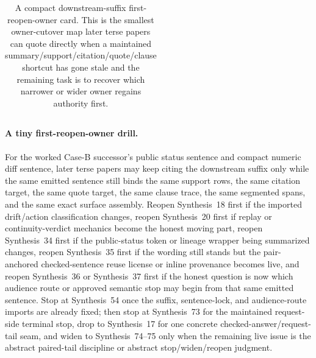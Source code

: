 \documentclass[11pt]{article}
\begin{document}
\begin{table}[t]
\begin{tabularx}{\linewidth}{@{}lX@{}}
\bottomrule
\end{tabularx}
\caption{A compact downstream-suffix first-reopen-owner card. This is the smallest owner-cutover map later terse papers can quote directly when a maintained summary/support/citation/quote/clause shortcut has gone stale and the remaining task is to recover which narrower or wider owner regains authority first.}
\label{tab:downstream-suffix-first-reopen-owner-card}
\end{table}

\paragraph{A tiny first-reopen-owner drill.}
For the worked Case-B successor's public status sentence and compact numeric diff sentence, later terse papers may keep citing the downstream suffix only while the same emitted sentence still binds the same support rows, the same citation target, the same quote target, the same clause trace, the same segmented spans, and the same exact surface assembly. Reopen Synthesis~18 first if the imported drift/action classification changes, reopen Synthesis~20 first if replay or continuity-verdict mechanics become the honest moving part, reopen Synthesis~34 first if the public-status token or lineage wrapper being summarized changes, reopen Synthesis~35 first if the wording still stands but the pair-anchored checked-sentence reuse license or inline provenance becomes live, and reopen Synthesis~36 or Synthesis~37 first if the honest question is now which audience route or approved semantic stop may begin from that same emitted sentence. Stop at Synthesis~54 once the suffix, sentence-lock, and audience-route imports are already fixed; then stop at Synthesis~73 for the maintained request-side terminal stop, drop to Synthesis~17 for one concrete checked-answer/request-tail seam, and widen to Synthesis~74--75 only when the remaining live issue is the abstract paired-tail discipline or abstract stop/widen/reopen judgment.\cite{series:workedexample,series:planstateequiv,series:auditorreplay,series:statusenvelopes,series:sentencelocks,series:challengeroutes,series:challengestops,series:challengeanswerreviewmenus,series:pairedterminalcitationdiscipline,series:pairedterminalcutoverrules,series:workedexample}
\end{document}
